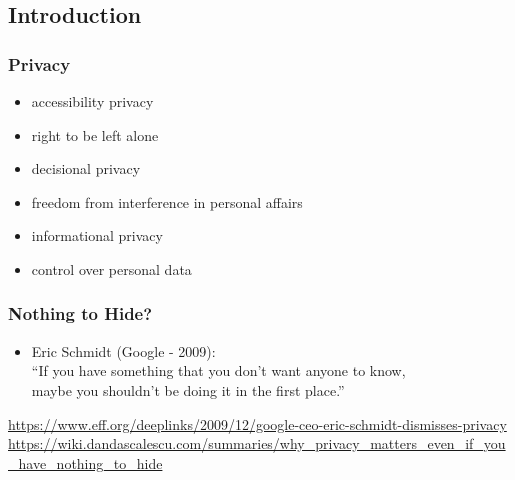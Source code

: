 \documentclass[dvipsnames]{beamer}
\theoremstyle{plain}
\begin{document}
\subsection{Introduction}

\begin{frame}
  \frametitle{Privacy}

  \begin{itemize}
    \item accessibility privacy
    \item right to be left alone

    \pause
    \bigskip
    \item decisional privacy
    \item freedom from interference in personal affairs

    \pause
    \bigskip
    \item informational privacy
    \item control over personal data
  \end{itemize}
\end{frame}

\begin{frame}
  \frametitle{Nothing to Hide?}

  \begin{center}
  \end{center}

  \begin{itemize}
    \item Eric Schmidt (Google - 2009):\\
    \smallskip
    ``If you have something that you don't want anyone to know,\\
    maybe you shouldn't be doing it in the first place.''
  \end{itemize}

  \medskip
  \tiny{\url{https://www.eff.org/deeplinks/2009/12/google-ceo-eric-schmidt-dismisses-privacy}}\\
  \tiny{\url{https://wiki.dandascalescu.com/summaries/why_privacy_matters_even_if_you_have_nothing_to_hide}}\\
\end{frame}
\end{document}
